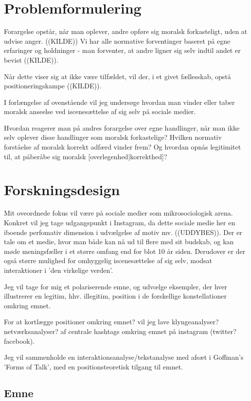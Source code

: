 \section{Problemformulering}

Forargelse opstår, når man oplever, andre opføre sig moralsk forkasteligt, uden
at udvise anger. ((KILDE)) Vi har alle normative forventinger baseret på egne
erfaringer og holdninger - man forventer, at andre ligner sig selv indtil andet
er bevist ((KILDE)).

Når dette viser sig at ikke være tilfældet, vil der, i et givet
fællesskab, opstå positioneringskampe ((KILDE)). 

I forlængelse af ovenstående vil jeg undersøge hvordan man vinder eller taber
moralsk anseelse ved iscenesættelse af sig selv på sociale medier.

Hvordan reagerer man på andres forargelse over egne handlinger, når man ikke
selv oplever disse handlinger som moralsk forkastelige? Hvilken normativ
forståelse af moralsk korrekt adfærd vinder frem? Og hvordan opnås legitimitet
til, at påberåbe sig moralsk [overlegenhed|korrekthed]?

\section{Forskningsdesign}

Mit oveordnede fokus vil være på sociale medier som mikrosociologisk
arena. Konkret vil jeg tage udgangspunkt i Instagram, da dette sociale medie
her en iboende perfomativ dimension i udvælgelse af motiv mv.  ((UDDYBES)).
Der er tale om et medie, hvor man både kan nå ud til flere med sit budskab, og
kan møde meningsfæller i et større omfang end for blot 10 år siden. Derudover
er der også større mulighed for omhyggelig iscenesættelse af sig selv, modsat
interaktioner i 'den virkelige verden'.

Jeg vil tage for mig et polariserende emne, og udvœlge eksempler, der hver
illustrerer en legitim, hhv. illegitim, position i de forskellige
konstellationer omkring emnet.

For at kortlægge positioner omkring emnet? vil jeg lave klyngeanalyser?
netværksanalyser? af centrale hashtags omkring emnet på instagram (twitter?
facebook).

Jeg vil sammenholde en interaktionsanalyse/tekstanalyse med afsæt i Goffman's
'Forms of Talk', med en positionsteoretisk tilgang til emnet.

\subsection{Emne}

